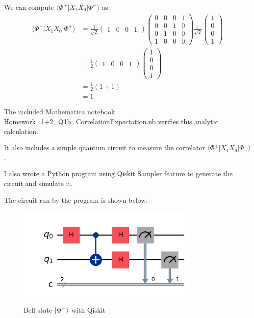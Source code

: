 \documentclass[12pt]{extarticle}
\begin{document}
\begin{enumerate}[(a)]
We can compute $\langle \Phi^{+}|X_1X_0|\Phi^{+}\rangle$ as:
\begin{align*}
\langle \Phi^{+}|X_1X_0|\Phi^{+}\rangle
& = \frac{1}{\sqrt{2}}\begin{pmatrix}1&0&0&1\end{pmatrix}
\begin{pmatrix}0&0&0&1\\0&0&1&0\\0&1&0&0\\1&0&0&0\end{pmatrix}
\frac{1}{\sqrt{2}} \begin{pmatrix}1\\0\\0\\1\end{pmatrix} \\
& = \frac{1}{2}\begin{pmatrix}1&0&0&1\end{pmatrix} \begin{pmatrix}1\\0\\0\\1\end{pmatrix} \\
& = \frac{1}{2}(1+1) \\
& = 1
\end{align*}

The included Mathematica notebook Homework\_1+2\_Q1b\_CorrelationExpectation.nb verifies this analytic calculation.

It also includes a simple quantum circuit to measure the correlator $\langle \Phi^{+}|X_1X_0|\Phi^{+}\rangle$.

I also wrote a Python program using Qiskit Sampler feature to generate the circuit and simulate it.

The circuit run by the program is shown below:

\begin{figure}[H]
\centering
\includegraphics[width=0.80\textwidth]{images/xcorrelator_qiskit.png}
\caption{Bell state $\ket{\Phi^{-}}$ with Qiskit}
\end{figure}


\end{enumerate}
\end{document}
